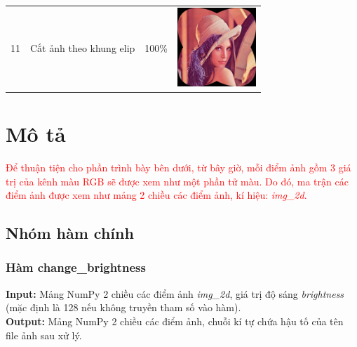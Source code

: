\documentclass{article}
\begin{document}
\begin{longtable}[c]{|r|l|c|l|}
  11 & Cắt ảnh theo khung elip & 100\% & \parbox[c]{8em}{\includegraphics[width=8em]{image/Lenna_elliptical_crop.png}} \\ \hline
\end{longtable}


\section{Mô tả}
\textcolor{red}{Để thuận tiện cho phần trình bày bên dưới, từ bây giờ, mỗi điểm ảnh gồm 3 giá trị của kênh màu RGB sẽ được xem như một phần tử màu. Do đó, ma trận các điểm ảnh được xem như mảng 2 chiều các điểm ảnh, kí hiệu: \textit{img\_2d}. }
\subsection{Nhóm hàm chính}
\subsubsection{Hàm change\_brightness}
\textbf{Input:} Mảng NumPy 2 chiều các điểm ảnh \textit{img\_2d}, giá trị độ sáng \textit{brightness} (mặc định là 128 nếu không truyền tham số vào hàm). \\
\textbf{Output:} Mảng NumPy 2 chiều các điểm ảnh, chuỗi kí tự chứa hậu tố của tên file ảnh sau xử lý.
\end{document}
